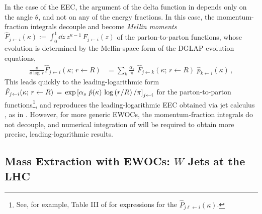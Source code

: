 In the case of the EEC, the argument of the delta function in   depends only on the angle \(\theta\), and not on any of the energy fractions.
%
In this case, the momentum-fraction integrals decouple and become \textit{Mellin moments}
\(
    \hat{F}_{j \leftarrow i}(\kappa)
    :=
    \int_0^1 \dd z \, z^{\kappa-1}\, F_{j \leftarrow i}(z)
\)
of the \gls{parton-to-parton} functions, whose evolution is determined by the Mellin-space form of the DGLAP evolution equations,
\begin{align}
    \frac{\dd}{\dd\log\, r}
    \hat{F}_{j\leftarrow i}(\kappa;\,
    r\leftarrow R)
    &=
    \sum_k
    \frac{\alpha_s}{\pi}
    \,\,
    \hat{F}_{j\leftarrow k}(\kappa;\,r\leftarrow R)
    \,\,
    \hat{p}_{k\leftarrow i}(\kappa)
    \,
    ,
\end{align}
%
This leads quickly to the leading-logarithmic form \(
    \hat{F}_{j\leftarrow i}(\kappa ;\,
    r\leftarrow R)
    \,
    =
    \,
    \exp\left[
        \alpha_s
        \,\,
        \hat{p}(\kappa)
        \,
        \log\left(r/R\right)
        /
        \pi
    \right]_{j \leftarrow i}
\) for the \gls{parton-to-parton} functions\footnote{
See, for example, Table III of  for expressions for the \(\hat P_{j\ell\leftarrow i}(\kappa)\).
}, and reproduces the leading-logarithmic EEC obtained via jet calculus \cite{Konishi:1978dg,Konishi:1978yx,Konishi:1978ks}, as in .
%
However, for more generic EWOCs, the momentum-fraction integrals do not decouple, and numerical integration of  will be required to obtain more precise, leading-logarithmic results.


\subsection{Mass Extraction with EWOCs: \texorpdfstring{\(W\)}{W} Jets at the LHC}
\label{sec:ewoc-mass}

